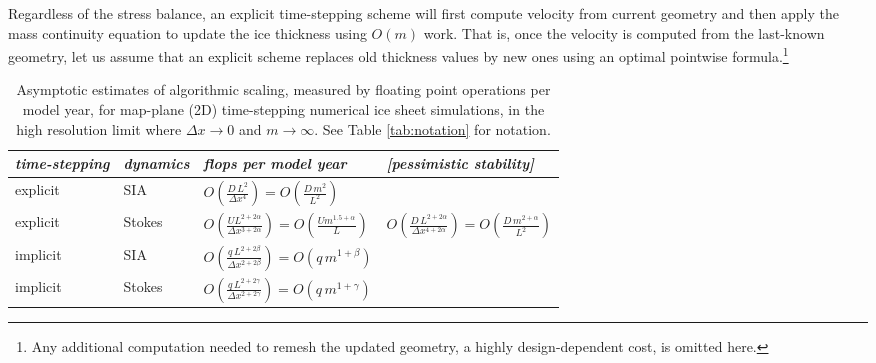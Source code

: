 \documentclass[review]{igs}
\begin{document}
Regardless of the stress balance, an explicit time-stepping scheme will first compute velocity from current geometry and then apply the mass continuity equation to update the ice thickness using $O(m)$ work.  That is, once the velocity is computed from the last-known geometry, let us assume that an explicit scheme replaces old thickness values by new ones using an optimal pointwise formula.\footnote{Any additional computation needed to remesh the updated geometry, a highly design-dependent cost, is omitted here.}

\newcommand{\oo}[1]{\displaystyle O\left(#1\right)}
\setlength{\tabcolsep}{5pt}
\renewcommand{\arraystretch}{1.5}
\begin{table*}[ht]
{\normalsize
\begin{tabular}{llll}
\emph{time-stepping} & \emph{dynamics} & \emph{flops per model year} & \emph{[pessimistic stability]} \\ \hline
explicit & SIA    & $\oo{\frac{D\, L^2}{\Delta x^4}} = \oo{\frac{D\, m^2}{L^2}}${\Huge \strut} \\
explicit & Stokes & $\oo{\frac{U L^{2+2\alpha}}{\Delta x^{3+2\alpha}}} = \oo{\frac{U m^{1.5+\alpha}}{L}}${\Huge \strut}\phantom{x} & $\oo{\frac{D\, L^{2+2\alpha}}{\Delta x^{4+2\alpha}}} = \oo{\frac{D\,m^{2+\alpha}}{L^2}}$ \\
implicit & SIA    & $\oo{\frac{q\, L^{2+2\beta}}{\Delta x^{2+2\beta}}} = \oo{q\, m^{1+\beta}}${\Huge \strut} \\
implicit & Stokes & $\oo{\frac{q\, L^{2+2\gamma}}{\Delta x^{2+2\gamma}}} = \oo{q\, m^{1+\gamma}}${\Huge \strut}
\end{tabular}
}
\caption{Asymptotic estimates of algorithmic scaling, measured by floating point operations per model year, for map-plane (2D) time-stepping numerical ice sheet simulations, in the high resolution limit where $\Delta x\to 0$ and $m\to\infty$.  See Table \ref{tab:notation} for notation.}
\label{tab:performancemodel}
\end{table*}
\end{document}
